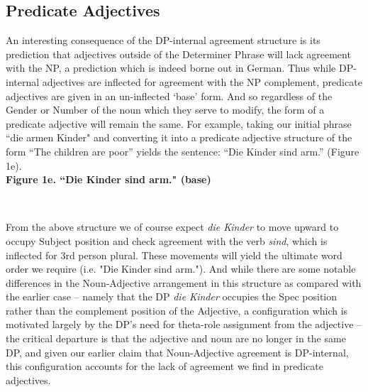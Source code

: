 \documentclass[12pt]{article}
\begin{document}
\begin{flushleft}
\subsection{Predicate Adjectives}
An interesting consequence of the DP-internal agreement structure is its prediction that adjectives outside of the Determiner Phrase will lack agreement with the NP, a prediction which is indeed borne out in German. Thus while DP-internal adjectives are inflected for agreement with the NP complement, predicate adjectives are given in an un-inflected `base' form. And so regardless of the Gender or Number of the noun which they serve to modify, the form of a predicate adjective will remain the same. For example, taking our initial phrase ``die armen Kinder" and converting it into a predicate adjective structure of the form ``The children are poor'' yields the sentence: ``Die Kinder sind arm.'' (Figure 1e).\\
\newpage
{\bf Figure 1e. ``Die Kinder sind arm." (base)}\\
{\centering
\bigskip
{}\\
}
\bigskip
From the above structure we of course expect {\it die Kinder} to move upward to occupy Subject position and check agreement with the verb {\it sind}, which is inflected for 3rd person plural. These movements will yield the ultimate word order we require (i.e. "Die Kinder sind arm."). And while there are some notable differences in the Noun-Adjective arrangement in this structure as compared with the earlier case -- namely that the DP {\it die Kinder} occupies the Spec position rather than the complement position of the Adjective, a configuration which is motivated largely by the DP's need for theta-role assignment from the adjective -- the critical departure is that the adjective and noun are no longer in the same DP, and given our earlier claim that Noun-Adjective agreement is DP-internal, this configuration accounts for the lack of agreement we find in predicate adjectives. 

\end{flushleft}
\end{document}

